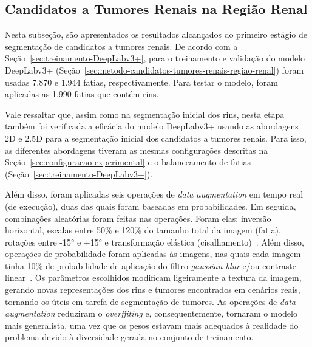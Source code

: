 \subsection{Candidatos a Tumores Renais na Região Renal}
\label{sec:resultados-candidatores-tumores-renais-regiao-renal}

Nesta subseção, são apresentados os resultados alcançados do primeiro estágio de segmentação de candidatos a tumores renais. De acordo com a Seção~\ref{sec:treinamento-DeepLabv3+}, para o treinamento e validação do modelo DeepLabv3+ (Seção~\ref{sec:metodo-candidatos-tumores-renais-regiao-renal}) foram usadas 7.870 e 1.944 fatias, respectivamente. Para testar o modelo, foram aplicadas as 1.990 fatias que contém rins.

Vale ressaltar que, assim como na segmentação inicial dos rins, nesta etapa também foi verificada a eficácia do modelo DeepLabv3+ usando as abordagens 2D e 2.5D para a segmentação inicial dos candidatos a tumores renais. Para isso, as diferentes abordagens tiveram as mesmas configurações descritas na Seção~\ref{sec:configuracao-experimental} e o balanceamento de fatias (Seção~\ref{sec:treinamento-DeepLabv3+}).

Além disso, foram aplicadas seis operações de \textit{data augmentation} em tempo real (de execução), duas das quais foram baseadas em probabilidades. Em seguida, combinações aleatórias foram feitas nas operações. Foram elas: inversão horizontal, escalas entre 50\% e 120\% do tamanho total da imagem (fatia), rotações entre -15° e +15° e transformação elástica (cisalhamento)~\cite{mikolajczyk2018data}. Além disso, operações de probabilidade foram aplicadas às imagens, nas quais cada imagem tinha 10\% de probabilidade de aplicação do filtro \textit{gaussian blur} e/ou contraste linear~\cite{gonzalez2008digital}. Os parâmetros escolhidos modificam ligeiramente a textura da imagem, gerando novas representações dos rins e tumores encontrados em cenários reais, tornando-os úteis em tarefa de segmentação de tumores. As operações de \textit{data augmentation} reduziram o \textit{overffiting} e, consequentemente, tornaram o modelo mais generalista, uma vez que os pesos estavam mais adequados à realidade do problema devido à diversidade gerada no conjunto de treinamento.

